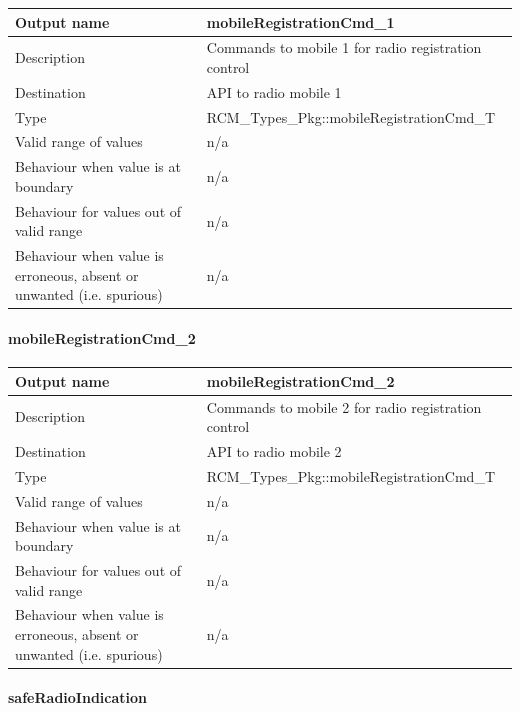 \begin{longtable}{p{}p{}}
	\toprule
	Output name				& mobileRegistrationCmd\_1 \\
	\midrule
	Description				& Commands to mobile 1 for radio registration control  \\
	\midrule
	Destination				& API to radio mobile 1 \\ 
	\midrule
	Type					& RCM\_Types\_Pkg::mobileRegistrationCmd\_T \\
	\midrule
	Valid range of values	& n/a \\
	\midrule
	Behaviour when value is at boundary	& n/a \\
	\midrule
	Behaviour for values out of valid range	& n/a \\
	\midrule
	Behaviour when value is erroneous, absent or unwanted (i.e. spurious) & n/a \\
	\bottomrule
\end{longtable}

\paragraph{mobileRegistrationCmd\_2}

\begin{longtable}{p{}p{}}
	\toprule
	Output name				& mobileRegistrationCmd\_2 \\
	\midrule
	Description				& Commands to mobile 2 for radio registration control  \\
	\midrule
	Destination				& API to radio mobile 2 \\ 
	\midrule
	Type					& RCM\_Types\_Pkg::mobileRegistrationCmd\_T \\
	\midrule
	Valid range of values	& n/a \\
	\midrule
	Behaviour when value is at boundary	& n/a \\
	\midrule
	Behaviour for values out of valid range	& n/a \\
	\midrule
	Behaviour when value is erroneous, absent or unwanted (i.e. spurious) & n/a \\
	\bottomrule
\end{longtable}

\paragraph{safeRadioIndication}

